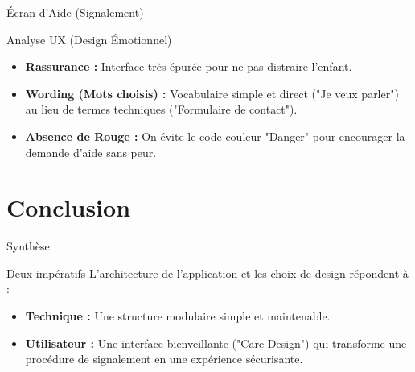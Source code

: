 \documentclass[10pt, aspectratio=169]{beamer}
\let\oldtextbf\textbf
\renewcommand{\textbf}[1]{{\color{strongBlue}\oldtextbf{#1}}}
\begin{document}
\begin{frame}{Écran d'Aide (Signalement)}
    \begin{alertblock}{Analyse UX (Design Émotionnel)}
        \begin{itemize}
            \item \textbf{Rassurance :} Interface très épurée pour ne pas distraire l'enfant.
            \item \textbf{Wording (Mots choisis) :} Vocabulaire simple et direct ("Je veux parler") au lieu de termes techniques ("Formulaire de contact").
            \item \textbf{Absence de Rouge :} On évite le code couleur "Danger" pour encourager la demande d'aide sans peur.
        \end{itemize}
    \end{alertblock}
\end{frame}

\section{Conclusion}
\begin{frame}{Synthèse}
    \begin{block}{Deux impératifs}
        L'architecture de l'application et les choix de design répondent à :
        \begin{itemize}
            \item \textbf{Technique :} Une structure modulaire simple et maintenable.
            \item \textbf{Utilisateur :} Une interface bienveillante ("Care Design") qui transforme une procédure de signalement en une expérience sécurisante.
        \end{itemize}
    \end{block}
\end{frame}
\end{document}
